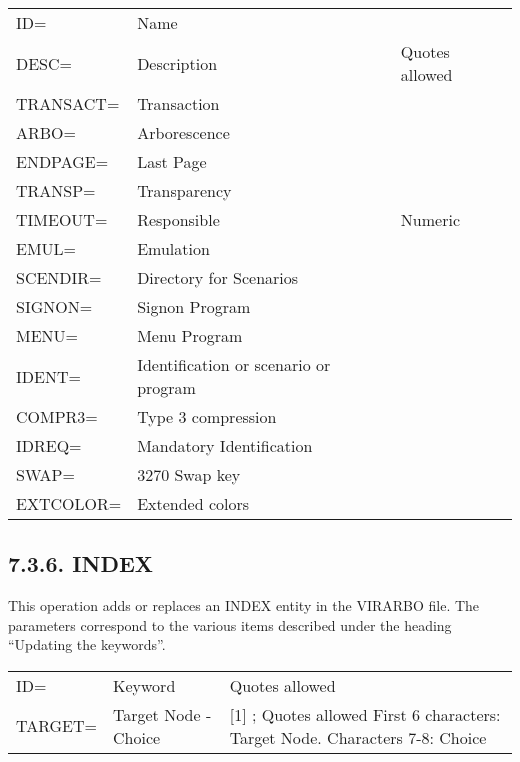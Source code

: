 \documentclass[letterpaper,10pt,english]{sphinxmanual}
\begin{document}
\begin{savenotes}\sphinxattablestart
\centering
\begin{tabulary}{\linewidth}[t]{|T|T|T|}
\hline
{}\relax &\relax &\relax \\
\hline
ID=
&
Name
&\\
\hline
DESC=
&
Description
&
Quotes allowed
\\
\hline
TRANSACT=
&
Transaction
&\\
\hline
ARBO=
&
Arborescence
&\\
\hline
ENDPAGE=
&
Last Page
&\\
\hline
TRANSP=
&
Transparency
&\\
\hline
TIMEOUT=
&
Responsible
&
Numeric
\\
\hline
EMUL=
&
Emulation
&\\
\hline
SCENDIR=
&
Directory for
Scenarios
&\\
\hline
SIGNON=
&
Signon Program
&\\
\hline
MENU=
&
Menu Program
&\\
\hline
IDENT=
&
Identification or
scenario or program
&\\
\hline
COMPR3=
&
Type 3 compression
&\\
\hline
IDREQ=
&
Mandatory
Identification
&\\
\hline
SWAP=
&
3270 Swap key
&\\
\hline
EXTCOLOR=
&
Extended colors
&\\
\hline
\end{tabulary}
\par
\sphinxattableend\end{savenotes}


\subsection{7.3.6. INDEX}
\label{\detokenize{Installation_Guide:index}}
This operation adds or replaces an INDEX entity in the VIRARBO file. The parameters correspond to the various items described under the heading “Updating the keywords”.


\begin{savenotes}\sphinxattablestart
\centering
\begin{tabulary}{\linewidth}[t]{|T|T|T|}
\hline
{}\relax &\relax &\relax \\
\hline
ID=
&
Keyword
&
Quotes allowed
\\
\hline
TARGET=
&
Target Node -
Choice
&
{[}1{]} ; Quotes allowed
First 6 characters: Target Node.
Characters 7-8: Choice
\\
\hline
\end{tabulary}
\par
\sphinxattableend\end{savenotes}
\end{document}
